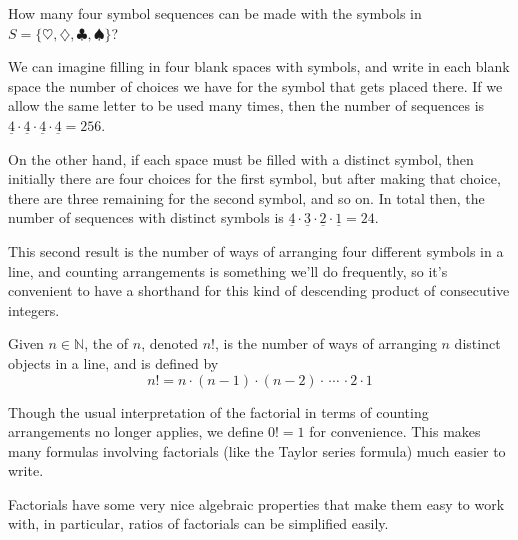 \begin{example}
How many four symbol sequences can be made with the symbols in $S = \{\heartsuit, \diamondsuit, \clubsuit, \spadesuit\}$?

We can imagine filling in four blank spaces with symbols, and write in each blank space the number of choices we have for the symbol that gets placed there. If we allow the same letter to be used many times, then the number of sequences is $\underline{4} \cdot \underline{4} \cdot \underline{4} \cdot \underline{4} = 256$.

On the other hand, if each space must be filled with a distinct symbol, then initially there are four choices for the first symbol, but after making that choice, there are three remaining for the second symbol, and so on. In total then, the number of sequences with distinct symbols is $\underline{4} \cdot \underline{3} \cdot \underline{2} \cdot \underline{1} = 24$. 
\end{example}

This second result is the number of ways of arranging four different symbols in a line, and counting arrangements is something we'll do frequently, so it's convenient to have a shorthand for this kind of descending product of consecutive integers.

\begin{definition}
Given $n \in \mathbb{N}$, the  of $n$, denoted $n!$, is the number of ways of arranging $n$ distinct objects in a line, and is defined by
$$n! = n \cdot (n-1) \cdot (n-2) \cdot \, \cdots \, \cdot 2 \cdot 1$$
\end{definition}

\begin{note} Though the usual interpretation of the factorial in terms of counting arrangements no longer applies, we define $0!=1$ for convenience. This makes many formulas involving factorials (like the Taylor series formula) much easier to write.
\end{note}

Factorials have some very nice algebraic properties that make them easy to work with, in particular, ratios of factorials can be simplified easily.
\par

